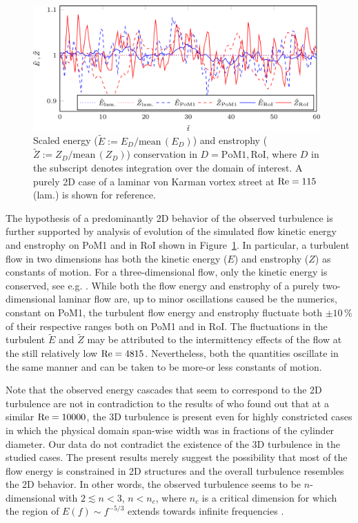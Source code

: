 \begin{figure}[htbp]
    \centering
    \includegraphics[width=0.98\textwidth]{02_images/00_export/figure8.png}
    \caption{Scaled energy ($\tilde{E} := E_{D}/\mathrm{mean}\,(E_{D})$) and enstrophy ($\tilde{Z} := Z_{D}/\mathrm{mean}\,(Z_{D})$) conservation in $D = \text{PoM1},\text{RoI}$, where $D$ in the subscript denotes integration over the domain of interest. A purely 2D case of a laminar von Karman vortex street at $\mathrm{Re} = 115$ (lam.) is shown for reference.}
    \label{fig:engEnsConserv}
\end{figure}
{The hypothesis of a predominantly 2D behavior of the observed turbulence is further supported by analysis of evolution of the simulated flow kinetic energy and enstrophy on PoM1 and in RoI shown in Figure~\ref{fig:engEnsConserv}. In particular, a turbulent flow in two dimensions has both the kinetic energy ($E$) and enstrophy ($Z$) as constants of motion. For a three-dimensional flow, only the kinetic energy is conserved, see e.g. \citep{kraichnan1967,rose1978,chorin1994}. While both the flow energy and enstrophy of a purely two-dimensional laminar flow are, up to minor oscillations caused be the numerics, constant on PoM1, the turbulent flow energy and enstrophy fluctuate both $\pm 10\,\%$ of their respective ranges both on PoM1 and in RoI. The fluctuations in the turbulent $\tilde{E}$ and $\tilde{Z}$ may be attributed to the intermittency effects \cite{rose1978} of the flow at the still relatively low $\mathrm{Re} = 4815$. Nevertheless, both the quantities oscillate in the same manner and can be taken to be more-or less constants of motion.}

{Note that the observed energy cascades that seem to correspond to the 2D turbulence are not in contradiction to the results of \citet{garcia2019} who found out that at a similar $\mathrm{Re} = 10000$, the 3D turbulence is present even for highly constricted cases in which the physical domain span-wise width was in fractions of the cylinder diameter. Our data do not contradict the existence of the 3D turbulence in the studied cases. The present results merely suggest the possibility that most of the flow energy is constrained in 2D structures and the overall turbulence resembles the 2D behavior. In other words, the observed turbulence seems to be $n$-dimensional with $2 \lesssim n < 3$, $n < n_{c}$, where $n_{c}$ is a critical dimension for which the region of $E(f)\sim f^{-5/3}$ extends towards infinite frequencies \cite{rose1978}.}

